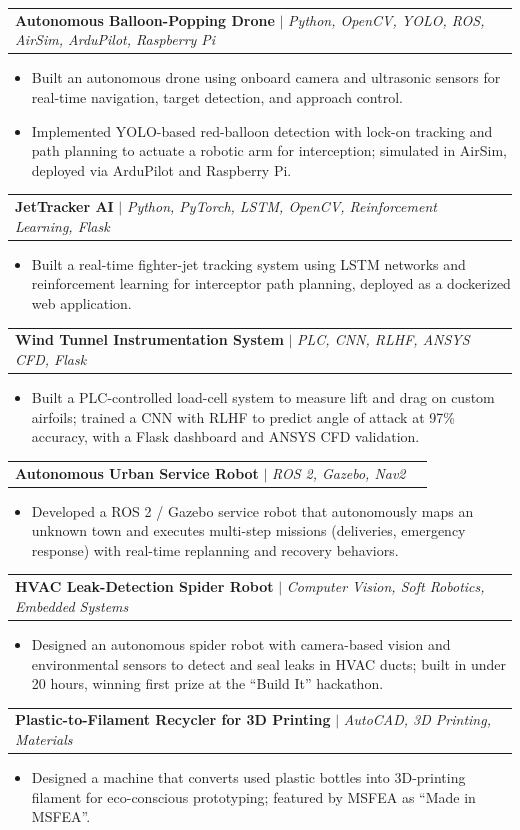 \documentclass[letterpaper,11pt]{article}
\makeatletter
\newcommand{\resumeItem}[1]{
  \item\small{
    {#1 \vspace{-2pt}}
  }
}
\newcommand{\resumeProjectHeading}[2]{
    \item
    \begin{tabular*}{0.97\textwidth}{l@{\extracolsep{\fill}}r}
      \small#1 & #2 \\
    \end{tabular*}\vspace{-7pt}
}
\newcommand{\resumeItemListStart}{\begin{itemize}}
\newcommand{\resumeItemListEnd}{\end{itemize}\vspace{-5pt}}
\makeatother
\begin{document}
      \resumeProjectHeading
          {\textbf{Autonomous Balloon-Popping Drone} $|$ \emph{Python, OpenCV, YOLO, ROS, AirSim, ArduPilot, Raspberry Pi}}{}
          \resumeItemListStart
            \resumeItem{Built an autonomous drone using onboard camera and ultrasonic sensors for real-time navigation, target detection, and approach control.}
            \resumeItem{Implemented YOLO-based red-balloon detection with lock-on tracking and path planning to actuate a robotic arm for interception; simulated in AirSim, deployed via ArduPilot and Raspberry Pi.}
          \resumeItemListEnd

      \resumeProjectHeading
          {\textbf{JetTracker AI} $|$ \emph{Python, PyTorch, LSTM, OpenCV, Reinforcement Learning, Flask}}{}
          \resumeItemListStart
            \resumeItem{Built a real-time fighter-jet tracking system using LSTM networks and reinforcement learning for interceptor path planning, deployed as a dockerized web application.}
          \resumeItemListEnd

      \resumeProjectHeading
          {\textbf{Wind Tunnel Instrumentation System} $|$ \emph{PLC, CNN, RLHF, ANSYS CFD, Flask}}{}
          \resumeItemListStart
            \resumeItem{Built a PLC-controlled load-cell system to measure lift and drag on custom airfoils; trained a CNN with RLHF to predict angle of attack at 97\% accuracy, with a Flask dashboard and ANSYS CFD validation.}
          \resumeItemListEnd

      \resumeProjectHeading
          {\textbf{Autonomous Urban Service Robot} $|$ \emph{ROS 2, Gazebo, Nav2}}{}
          \resumeItemListStart
            \resumeItem{Developed a ROS 2 / Gazebo service robot that autonomously maps an unknown town and executes multi-step missions (deliveries, emergency response) with real-time replanning and recovery behaviors.}
          \resumeItemListEnd

      \resumeProjectHeading
          {\textbf{HVAC Leak-Detection Spider Robot} $|$ \emph{Computer Vision, Soft Robotics, Embedded Systems}}{}
          \resumeItemListStart
            \resumeItem{Designed an autonomous spider robot with camera-based vision and environmental sensors to detect and seal leaks in HVAC ducts; built in under 20 hours, winning first prize at the ``Build It'' hackathon.}
          \resumeItemListEnd

      \resumeProjectHeading
          {\textbf{Plastic-to-Filament Recycler for 3D Printing} $|$ \emph{AutoCAD, 3D Printing, Materials}}{}
          \resumeItemListStart
            \resumeItem{Designed a machine that converts used plastic bottles into 3D-printing filament for eco-conscious prototyping; featured by MSFEA as ``Made in MSFEA''.}
          \resumeItemListEnd
\end{document}

